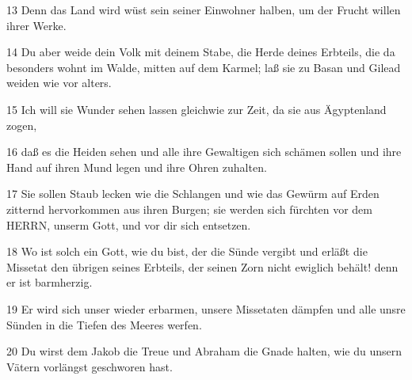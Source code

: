 \par 13 Denn das Land wird wüst sein seiner Einwohner halben, um der Frucht willen ihrer Werke.
\par 14 Du aber weide dein Volk mit deinem Stabe, die Herde deines Erbteils, die da besonders wohnt im Walde, mitten auf dem Karmel; laß sie zu Basan und Gilead weiden wie vor alters.
\par 15 Ich will sie Wunder sehen lassen gleichwie zur Zeit, da sie aus Ägyptenland zogen,
\par 16 daß es die Heiden sehen und alle ihre Gewaltigen sich schämen sollen und ihre Hand auf ihren Mund legen und ihre Ohren zuhalten.
\par 17 Sie sollen Staub lecken wie die Schlangen und wie das Gewürm auf Erden zitternd hervorkommen aus ihren Burgen; sie werden sich fürchten vor dem HERRN, unserm Gott, und vor dir sich entsetzen.
\par 18 Wo ist solch ein Gott, wie du bist, der die Sünde vergibt und erläßt die Missetat den übrigen seines Erbteils, der seinen Zorn nicht ewiglich behält! denn er ist barmherzig.
\par 19 Er wird sich unser wieder erbarmen, unsere Missetaten dämpfen und alle unsre Sünden in die Tiefen des Meeres werfen.
\par 20 Du wirst dem Jakob die Treue und Abraham die Gnade halten, wie du unsern Vätern vorlängst geschworen hast.

